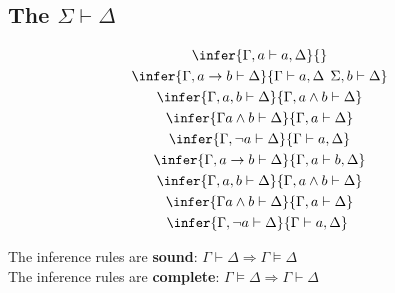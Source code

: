 \documentclass{article}
\begin{document}
\subsection{The $\Sigma \vdash \Delta$}
\begin{gather*}
	\infer{\Gamma, a\vdash a, \Delta}{}\\
	\infer{\Gamma, a \to b \vdash \Delta}{\Gamma \vdash a, \Delta\:\:\Sigma,b\vdash \Delta}\\
	\infer{\Gamma,a,b\vdash \Delta}{\Gamma,a\wedge b\vdash \Delta}\\
	\infer{\Gamma a\wedge b\vdash \Delta}{\Gamma, a\vdash \Delta}\\
	\infer{\Gamma,\neg a\vdash\Delta}{\Gamma\vdash a,\Delta}\\
	\infer{\Gamma, a \to b \vdash \Delta}{\Gamma,a\vdash b, \Delta}\\
	\infer{\Gamma,a,b\vdash \Delta}{\Gamma,a\wedge b\vdash \Delta}\\
	\infer{\Gamma a\wedge b\vdash \Delta}{\Gamma, a\vdash \Delta}\\
	\infer{\Gamma,\neg a\vdash\Delta}{\Gamma\vdash a,\Delta}
	\
\end{gather*}
\begin{theorem}
	The inference rules are \textbf{sound}: $\Gamma\vdash\Delta \Rightarrow \Gamma\vDash \Delta$\\
	The inference rules are \textbf{complete}: $\Gamma\vDash\Delta\Rightarrow\Gamma\vdash\Delta$
\end{theorem}
\end{document}
